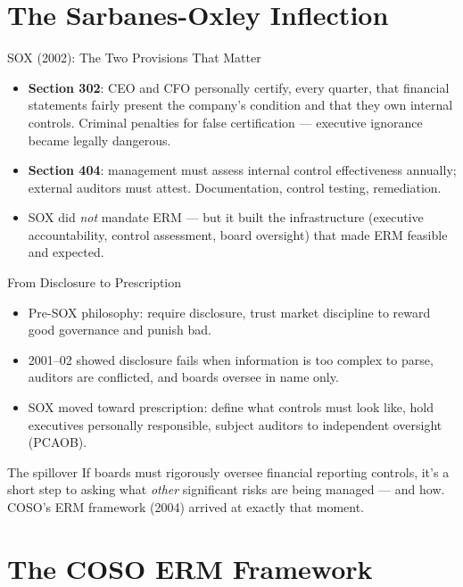 \documentclass[11pt, aspectratio=169]{beamer}
\begin{document}
\section{The Sarbanes-Oxley Inflection}

\begin{frame}{SOX (2002): The Two Provisions That Matter}
\begin{itemize}
  \item \textbf{Section 302}: CEO and CFO personally certify, every quarter, that financial statements fairly present the company's condition and that they own internal controls. \alert{Criminal penalties} for false certification --- executive ignorance became legally dangerous.
  \item \textbf{Section 404}: management must assess internal control effectiveness annually; external auditors must attest. Documentation, control testing, remediation.
  \item SOX did \emph{not} mandate ERM --- but it built the infrastructure (executive accountability, control assessment, board oversight) that made ERM feasible and expected.
\end{itemize}
\end{frame}

\begin{frame}{From Disclosure to Prescription}
\begin{itemize}
  \item Pre-SOX philosophy: require disclosure, trust market discipline to reward good governance and punish bad.
  \item 2001--02 showed disclosure fails when information is too complex to parse, auditors are conflicted, and boards oversee in name only.
  \item SOX moved toward \alert{prescription}: define what controls must look like, hold executives personally responsible, subject auditors to independent oversight (PCAOB).
\end{itemize}
\medskip
\begin{block}{The spillover}
If boards must rigorously oversee financial reporting controls, it's a short step to asking what \emph{other} significant risks are being managed --- and how. COSO's ERM framework (2004) arrived at exactly that moment.
\end{block}
\end{frame}

\section{The COSO ERM Framework}
\end{document}
